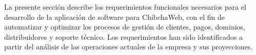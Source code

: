 La presente sección describe los requerimientos funcionales necesarios para el desarrollo de la aplicación de software para ChibchaWeb, con el fin de automatizar y optimizar los procesos de gestión de clientes, pagos, dominios, distribuidores y soporte técnico. Los requerimientos han sido identificados a partir del análisis de las operaciones actuales de la empresa y sus proyecciones.
